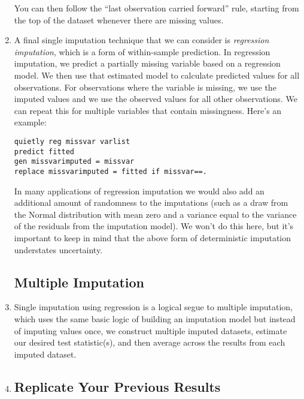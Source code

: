 \documentclass[a4paper,12pt]{article}
\begin{document}
\begin{enumerate}
You can then follow the ``last observation carried forward'' rule, starting from the top of the dataset whenever there are missing values. 

\item A final single imputation technique that we can consider is {\em regression imputation}, which is a form of within-sample prediction. In regression imputation, we predict a partially missing variable based on a regression model. We then use that estimated model to calculate predicted values for all observations. For observations where the variable is missing, we use the imputed values and we use the observed values for all other observations. We can repeat this for multiple variables that contain missingness. Here's an example:

\begin{verbatim}
quietly reg missvar varlist
predict fitted
gen missvarimputed = missvar
replace missvarimputed = fitted if missvar==.
\end{verbatim}

In many applications of regression imputation we would also add an additional amount of randomness to the imputations (such as a draw from the Normal distribution with mean zero and a variance equal to the variance of the residuals from the imputation model). We won't do this here, but it's important to keep in mind that the above form of deterministic imputation understates uncertainty.

\subsection*{Multiple Imputation}

\item Single imputation using regression is a logical segue to multiple imputation, which uses the same basic logic of building an imputation model but instead of imputing values once, we construct multiple imputed datasets, estimate our desired test statistic(s), and then average across the results from each imputed dataset.

\item %


\subsection*{Replicate Your Previous Results}


\end{enumerate}
\end{document}
